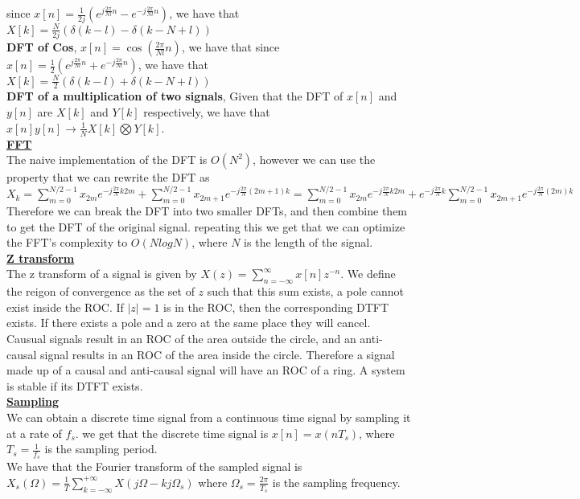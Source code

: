 \documentclass[9pt]{article}
\begin{document}
since $x[n]=\frac{1}{2j}\left(e^{j\frac{2\pi}{Nl}n}-e^{-j\frac{2\pi}{Nl}n}\right)$, we have that
$X[k]=\frac{N}{2j}\left(\delta(k-l)-\delta(k-N+l)\right)$\\
\textbf{DFT of Cos}, $x[n]=\cos(\frac{2\pi}{Nl}n)$, we have that
since $x[n]=\frac{1}{2}\left(e^{j\frac{2\pi}{Nl}n}+e^{-j\frac{2\pi}{Nl}n}\right)$, we have that
$X[k]=\frac{N}{2}\left(\delta(k-l)+\delta(k-N+l)\right)$\\
\textbf{DFT of a multiplication of two signals}, Given that 
the DFT of $x[n]$ and $y[n]$ are $X[k]$ and $Y[k]$ respectively, we have that
$x[n]y[n]\to \frac{1}{N} X[k]\bigotimes Y[k]$.\\
\underline{\textbf{FFT}}\\
The naive implementation of the DFT is $O(N^2)$, however we can use the
property that we can rewrite the DFT as 
$X_k=\sum_{m=0}^{N/2-1}x_{2m}e^{-j\frac{2\pi}{N}k2m}+\sum_{m=0}^{N/2-1}x_{2m+1}e^{-j\frac{2\pi}{N}(2m+1)k}
=\sum_{m=0}^{N/2-1}x_{2m}e^{-j\frac{2\pi}{N}k2m}+e^{-j\frac{2\pi}{N}k}\sum_{m=0}^{N/2-1}x_{2m+1}e^{-j\frac{2\pi}{N}(2m)k}$
Therefore we can break the DFT into two smaller DFTs, and then combine them to get the DFT of the original signal.
repeating this we get that we can optimize the FFT's complexity to 
$O(NlogN)$, where $N$ is the length of the signal.\\
\underline{\textbf{Z transform}}\\
The z transform of a signal is given by $X(z)=\sum_{n=-\infty}^{\infty}x[n]z^{-n}$. We define the 
reigon of convergence as the set of $z$ such that this sum exists, a pole 
cannot exist inside the ROC. If $|z|=1$
is in the ROC, then the corresponding DTFT exists. If there exists 
a pole and a zero at the same place they will cancel. Causual signals
result in an ROC of the area outside the circle, and an anti-causal signal
results in an ROC of the area inside the circle. Therefore a signal 
made up of a causal and anti-causal signal will have an ROC of a ring. A system
is stable if its DTFT exists.\\
\underline{\textbf{Sampling}}\\
We can obtain a discrete time signal from a continuous time signal by sampling it at a rate of $f_s$.
we get that the discrete time signal is $x[n]=x(nT_s)$, where $T_s=\frac{1}{f_s}$ is the sampling period.\\
We have that the Fourier transform of the sampled signal is 
$X_{s}(\Omega)=\frac{1}{T}\sum_{k=-\infty}^{+\infty}X(j\Omega-kj\Omega_s)$
where $\Omega_s=\frac{2\pi}{T_s}$ is the sampling frequency.\\
\end{document}
